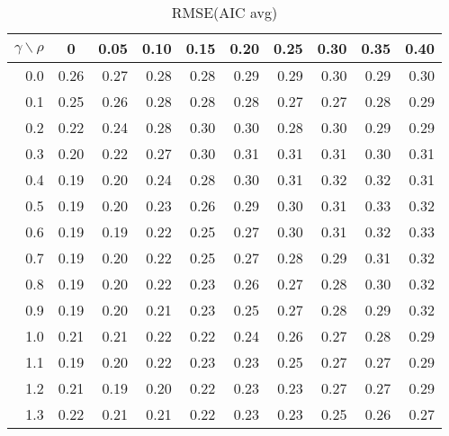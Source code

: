 \documentclass[12pt]{article}
\begin{document}
\begin{table}[!tbp]
\caption{RMSE(AIC avg)}
 \begin{center}
 \begin{tabular}{r|rrrrrrrrr}\hline\hline
\multicolumn{1}{c|}{$\gamma\backslash\rho$}&\multicolumn{1}{c}{0}&\multicolumn{1}{c}{0.05}&\multicolumn{1}{c}{0.10}&\multicolumn{1}{c}{0.15}&\multicolumn{1}{c}{0.20}&\multicolumn{1}{c}{0.25}&\multicolumn{1}{c}{0.30}&\multicolumn{1}{c}{0.35}&\multicolumn{1}{c}{0.40}\tabularnewline
\hline

0.0&0.26&0.27&0.28&0.28&0.29&0.29&0.30&0.29&0.30\tabularnewline
0.1&0.25&0.26&0.28&0.28&0.28&0.27&0.27&0.28&0.29\tabularnewline
0.2&0.22&0.24&0.28&0.30&0.30&0.28&0.30&0.29&0.29\tabularnewline
0.3&0.20&0.22&0.27&0.30&0.31&0.31&0.31&0.30&0.31\tabularnewline
0.4&0.19&0.20&0.24&0.28&0.30&0.31&0.32&0.32&0.31\tabularnewline
0.5&0.19&0.20&0.23&0.26&0.29&0.30&0.31&0.33&0.32\tabularnewline
0.6&0.19&0.19&0.22&0.25&0.27&0.30&0.31&0.32&0.33\tabularnewline
0.7&0.19&0.20&0.22&0.25&0.27&0.28&0.29&0.31&0.32\tabularnewline
0.8&0.19&0.20&0.22&0.23&0.26&0.27&0.28&0.30&0.32\tabularnewline
0.9&0.19&0.20&0.21&0.23&0.25&0.27&0.28&0.29&0.32\tabularnewline
1.0&0.21&0.21&0.22&0.22&0.24&0.26&0.27&0.28&0.29\tabularnewline
1.1&0.19&0.20&0.22&0.23&0.23&0.25&0.27&0.27&0.29\tabularnewline
1.2&0.21&0.19&0.20&0.22&0.23&0.23&0.27&0.27&0.29\tabularnewline
1.3&0.22&0.21&0.21&0.22&0.23&0.23&0.25&0.26&0.27\tabularnewline
\hline
\end{tabular}

\end{center}

\end{table}

%
\end{document}
